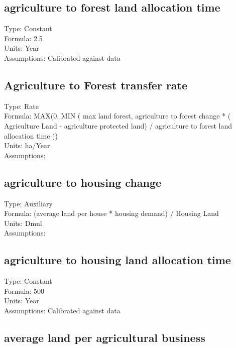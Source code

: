 \documentclass[
  11pt,
]{book}
\begin{document}
\hypertarget{agriculture-to-forest-land-allocation-time}{%
\subsection{agriculture to forest land allocation time}\label{agriculture-to-forest-land-allocation-time}}

Type: Constant\\
Formula: 2.5\\
Units: Year\\
Assumptions: Calibrated against data

\hypertarget{agriculture-to-forest-transfer-rate}{%
\subsection{Agriculture to Forest transfer rate}\label{agriculture-to-forest-transfer-rate}}

Type: Rate\\
Formula: MAX(0, MIN ( max land forest, agriculture to forest change * ( Agriculture Land - agriculture protected land) / agriculture to forest land allocation time ))\\
Units: ha/Year\\
Assumptions:

\hypertarget{agriculture-to-housing-change}{%
\subsection{agriculture to housing change}\label{agriculture-to-housing-change}}

Type: Auxiliary\\
Formula: (average land per house * housing demand) / Housing Land\\
Units: Dmnl\\
Assumptions:

\hypertarget{agriculture-to-housing-land-allocation-time}{%
\subsection{agriculture to housing land allocation time}\label{agriculture-to-housing-land-allocation-time}}

Type: Constant\\
Formula: 500\\
Units: Year\\
Assumptions: Calibrated against data

\hypertarget{average-land-per-agricultural-business}{%
\subsection{average land per agricultural business}\label{average-land-per-agricultural-business}}
\end{document}

